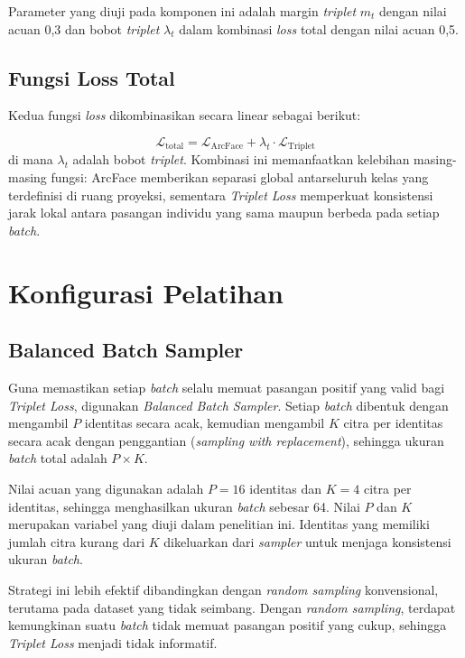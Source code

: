 Parameter yang diuji pada komponen ini adalah margin \textit{triplet} $m_t$ dengan nilai acuan 0,3 dan bobot \textit{triplet} $\lambda_t$ dalam kombinasi \textit{loss} total dengan nilai acuan 0,5.

\subsection{Fungsi Loss Total}

Kedua fungsi \textit{loss} dikombinasikan secara linear sebagai berikut:

\begin{equation}
    \mathcal{L}_{\text{total}} = \mathcal{L}_{\text{ArcFace}} + \lambda_t \cdot \mathcal{L}_{\text{Triplet}}
\end{equation}
di mana $\lambda_t$ adalah bobot \textit{triplet}. Kombinasi ini memanfaatkan kelebihan masing-masing fungsi: ArcFace memberikan separasi global antarseluruh kelas yang terdefinisi di ruang proyeksi, sementara \textit{Triplet Loss} memperkuat konsistensi jarak lokal antara pasangan individu yang sama maupun berbeda pada setiap \textit{batch}.

\section{Konfigurasi Pelatihan}
\subsection{Balanced Batch Sampler}

Guna memastikan setiap \textit{batch} selalu memuat pasangan positif yang valid bagi \textit{Triplet Loss}, digunakan \textit{Balanced Batch Sampler}. Setiap \textit{batch} dibentuk dengan mengambil $P$ identitas secara acak, kemudian mengambil $K$ citra per identitas secara acak dengan penggantian (\textit{sampling with replacement}), sehingga ukuran \textit{batch} total adalah $P \times K$.

Nilai acuan yang digunakan adalah $P = 16$ identitas dan $K = 4$ citra per identitas, sehingga menghasilkan ukuran \textit{batch} sebesar 64. Nilai $P$ dan $K$ merupakan variabel yang diuji dalam penelitian ini. Identitas yang memiliki jumlah citra kurang dari $K$ dikeluarkan dari \textit{sampler} untuk menjaga konsistensi ukuran \textit{batch}.

Strategi ini lebih efektif dibandingkan dengan \textit{random sampling} konvensional, terutama pada dataset yang tidak seimbang. Dengan \textit{random sampling}, terdapat kemungkinan suatu \textit{batch} tidak memuat pasangan positif yang cukup, sehingga \textit{Triplet Loss} menjadi tidak informatif.

